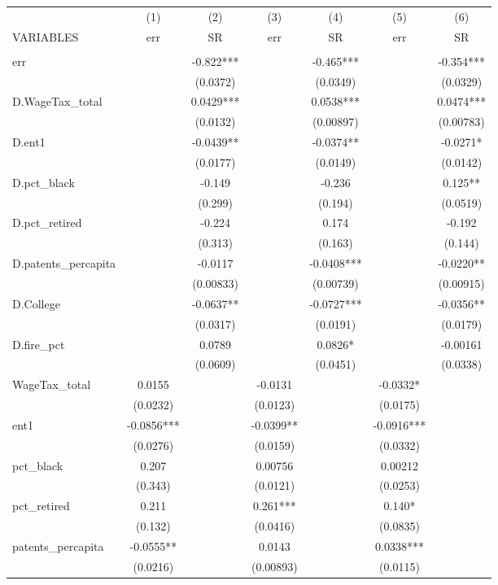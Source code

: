 \begin{tabular}{lcccccc} \hline
 & (1) & (2) & (3) & (4) & (5) & (6) \\
VARIABLES & err & SR & err & SR & err & SR \\ \hline
 &  &  &  &  &  &  \\
err &  & -0.822*** &  & -0.465*** &  & -0.354*** \\
 &  & (0.0372) &  & (0.0349) &  & (0.0329) \\
D.WageTax\_total &  & 0.0429*** &  & 0.0538*** &  & 0.0474*** \\
 &  & (0.0132) &  & (0.00897) &  & (0.00783) \\
D.ent1 &  & -0.0439** &  & -0.0374** &  & -0.0271* \\
 &  & (0.0177) &  & (0.0149) &  & (0.0142) \\
D.pct\_black &  & -0.149 &  & -0.236 &  & 0.125** \\
 &  & (0.299) &  & (0.194) &  & (0.0519) \\
D.pct\_retired &  & -0.224 &  & 0.174 &  & -0.192 \\
 &  & (0.313) &  & (0.163) &  & (0.144) \\
D.patents\_percapita &  & -0.0117 &  & -0.0408*** &  & -0.0220** \\
 &  & (0.00833) &  & (0.00739) &  & (0.00915) \\
D.College &  & -0.0637** &  & -0.0727*** &  & -0.0356** \\
 &  & (0.0317) &  & (0.0191) &  & (0.0179) \\
D.fire\_pct &  & 0.0789 &  & 0.0826* &  & -0.00161 \\
 &  & (0.0609) &  & (0.0451) &  & (0.0338) \\
WageTax\_total & 0.0155 &  & -0.0131 &  & -0.0332* &  \\
 & (0.0232) &  & (0.0123) &  & (0.0175) &  \\
ent1 & -0.0856*** &  & -0.0399** &  & -0.0916*** &  \\
 & (0.0276) &  & (0.0159) &  & (0.0332) &  \\
pct\_black & 0.207 &  & 0.00756 &  & 0.00212 &  \\
 & (0.343) &  & (0.0121) &  & (0.0253) &  \\
pct\_retired & 0.211 &  & 0.261*** &  & 0.140* &  \\
 & (0.132) &  & (0.0416) &  & (0.0835) &  \\
patents\_percapita & -0.0555** &  & 0.0143 &  & 0.0338*** &  \\
 & (0.0216) &  & (0.00893) &  & (0.0115) &  \\

\end{tabular}
